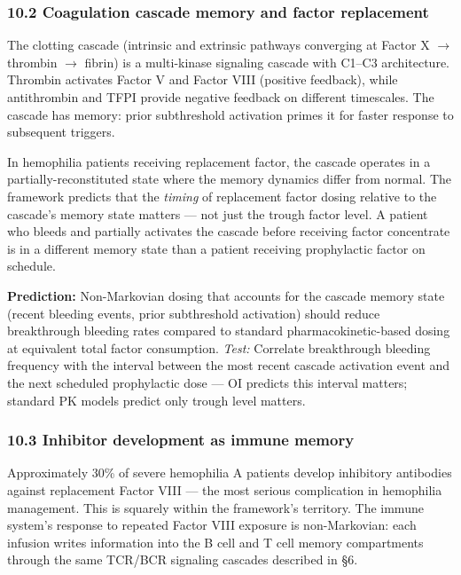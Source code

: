 \documentclass[
]{article}
\begin{document}
\hypertarget{coagulation-cascade-memory-and-factor-replacement}{%
\subsubsection{10.2 Coagulation cascade memory and factor
replacement}\label{coagulation-cascade-memory-and-factor-replacement}}

The clotting cascade (intrinsic and extrinsic pathways converging at
Factor X \(\to\) thrombin \(\to\) fibrin) is a multi-kinase signaling
cascade with C1--C3 architecture. Thrombin activates Factor V and Factor
VIII (positive feedback), while antithrombin and TFPI provide negative
feedback on different timescales. The cascade has memory: prior
subthreshold activation primes it for faster response to subsequent
triggers.

In hemophilia patients receiving replacement factor, the cascade
operates in a partially-reconstituted state where the memory dynamics
differ from normal. The framework predicts that the \emph{timing} of
replacement factor dosing relative to the cascade's memory state matters
--- not just the trough factor level. A patient who bleeds and partially
activates the cascade before receiving factor concentrate is in a
different memory state than a patient receiving prophylactic factor on
schedule.

\textbf{Prediction:} Non-Markovian dosing that accounts for the cascade
memory state (recent bleeding events, prior subthreshold activation)
should reduce breakthrough bleeding rates compared to standard
pharmacokinetic-based dosing at equivalent total factor consumption.
\emph{Test:} Correlate breakthrough bleeding frequency with the interval
between the most recent cascade activation event and the next scheduled
prophylactic dose --- OI predicts this interval matters; standard PK
models predict only trough level matters.

\hypertarget{inhibitor-development-as-immune-memory}{%
\subsubsection{10.3 Inhibitor development as immune
memory}\label{inhibitor-development-as-immune-memory}}

Approximately 30\% of severe hemophilia A patients develop inhibitory
antibodies against replacement Factor VIII --- the most serious
complication in hemophilia management. This is squarely within the
framework's territory. The immune system's response to repeated Factor
VIII exposure is non-Markovian: each infusion writes information into
the B cell and T cell memory compartments through the same TCR/BCR
signaling cascades described in §6.
\end{document}
